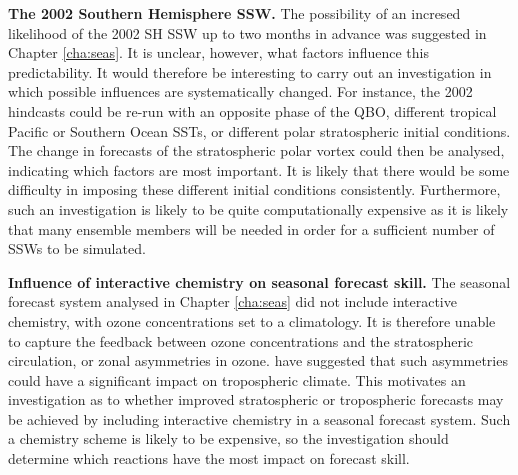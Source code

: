 \bigskip\noindent\textbf{The 2002 Southern Hemisphere SSW.} The possibility of
an incresed likelihood of the 2002 SH SSW up to two months in advance was
suggested in Chapter \ref{cha:seas}. It is unclear, however, what factors
influence this predictability. It would therefore be interesting to carry out an
investigation in which possible influences are systematically changed. For
instance, the 2002 hindcasts could be re-run with an opposite phase of the QBO,
different tropical Pacific or Southern Ocean SSTs, or different polar
stratospheric initial conditions. The change in forecasts of the stratospheric
polar vortex could then be analysed, indicating which factors are most
important. It is likely that there would be some difficulty in imposing these
different initial conditions consistently. Furthermore, such an investigation is
likely to be quite computationally expensive as it is likely that many ensemble
members will be needed in order for a sufficient number of SSWs to be
simulated. 

\bigskip\noindent\textbf{Influence of interactive chemistry on seasonal forecast
  skill.} The seasonal forecast system analysed in Chapter \ref{cha:seas} did
not include interactive chemistry, with ozone concentrations set to a
climatology. It is therefore unable to capture the feedback between ozone
concentrations and the stratospheric circulation, or zonal asymmetries in
ozone. \citet{Waugh2009} have suggested that such asymmetries could have a
significant impact on tropospheric climate. This motivates an investigation as
to whether improved stratospheric or tropospheric forecasts may be achieved by
including interactive chemistry in a seasonal forecast system. Such a chemistry
scheme is likely to be expensive, so the investigation should determine which
reactions have the most impact on forecast skill.  



